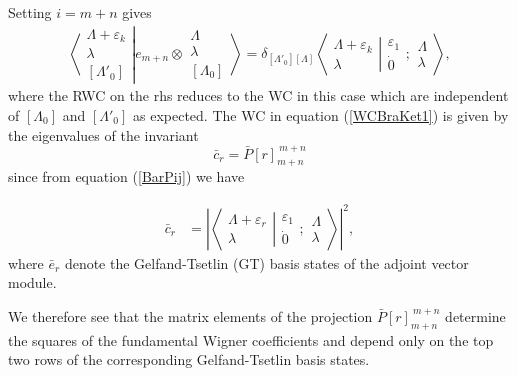 \documentclass[12pt]{article}
\begin{document}
Setting $i=m+n$ gives
\begin{align}
\left\langle\left. 
\begin{array}{c} \Lambda+\varepsilon_k\\ \lambda \\ {[\Lambda'_0]} \end{array}
\right|\right.
\left.
e_{m+n} \otimes \begin{array}{c} \Lambda \\ \lambda \\
{[\Lambda_0]} \end{array}
\right\rangle = \delta_{[\Lambda'_0][\Lambda]}
 \left\langle\left. 
\begin{array}{c} \Lambda+\varepsilon_k\\ \lambda \end{array}
\right|\right.
\left.
\begin{array}{c} 
\varepsilon_1 \\ \dot{0}
\end{array}
;
\begin{array}{c} \Lambda \\ 
\lambda \end{array}
\right\rangle  , \label{WCBraKet1}
\end{align}
where the RWC on the rhs reduces to the WC in this case which are independent of $[\Lambda_0]$ and $[\Lambda'_0]$ as expected. 
The WC in equation (\ref{WCBraKet1}) is given by the eigenvalues of the invariant
$$ 
\bar{c}_r = \bar{P}[r]_{m+n}^{\ m+n}
$$
since from equation (\ref{BarPij}) we have

\begin{align}
\bar{c}_r  &= \left| \left\langle\left. 
\begin{array}{c} \Lambda+\varepsilon_r\\ \lambda \end{array}
\right|\right.
\left.
\begin{array}{c} \varepsilon_1 \\
\dot{0} \end{array} 
;
 \begin{array}{c} \Lambda \\
\lambda \end{array}
\right\rangle \right|^2, \label{WigCoefCBar}
\end{align}
where $\bar{e}_r$ denote the Gelfand-Tsetlin (GT) basis states of the adjoint vector module.

We therefore see that the matrix elements of the projection $\bar{P}[r]_{m+n}^{\ m+n}$ determine
the squares of the fundamental Wigner coefficients and depend only on the top two rows of the corresponding Gelfand-Tsetlin basis states.
\end{document}
